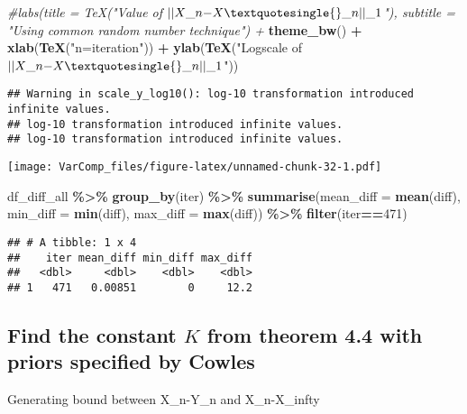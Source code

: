 \documentclass[
]{article}
\newenvironment{Shaded}{\begin{snugshade}}{\end{snugshade}}
\newcommand{\AttributeTok}[1]{\textcolor[rgb]{0.13,0.29,0.53}{#1}}
\newcommand{\CommentTok}[1]{\textcolor[rgb]{0.56,0.35,0.01}{\textit{#1}}}
\newcommand{\DecValTok}[1]{\textcolor[rgb]{0.00,0.00,0.81}{#1}}
\newcommand{\FunctionTok}[1]{\textcolor[rgb]{0.13,0.29,0.53}{\textbf{#1}}}
\newcommand{\NormalTok}[1]{#1}
\newcommand{\SpecialCharTok}[1]{\textcolor[rgb]{0.81,0.36,0.00}{\textbf{#1}}}
\newcommand{\StringTok}[1]{\textcolor[rgb]{0.31,0.60,0.02}{#1}}
\begin{document}
\begin{Shaded}
\begin{Highlighting}[]
  \CommentTok{\#labs(title = TeX("Value of $||X\_n{-}X\textquotesingle{}\_n||\_1$"), subtitle = "Using common random number technique") +}
  \FunctionTok{theme\_bw}\NormalTok{() }\SpecialCharTok{+}
  \FunctionTok{xlab}\NormalTok{(}\FunctionTok{TeX}\NormalTok{(}\StringTok{"n=iteration"}\NormalTok{)) }\SpecialCharTok{+} \FunctionTok{ylab}\NormalTok{(}\FunctionTok{TeX}\NormalTok{(}\StringTok{"Logscale of $||X\_n{-}X\textquotesingle{}\_n||\_1$"}\NormalTok{))}
\end{Highlighting}
\end{Shaded}

\begin{verbatim}
## Warning in scale_y_log10(): log-10 transformation introduced infinite values.
## log-10 transformation introduced infinite values.
## log-10 transformation introduced infinite values.
\end{verbatim}

\texttt{[image: VarComp\_files/figure-latex/unnamed-chunk-32-1.pdf]}

\begin{Shaded}
\begin{Highlighting}[]
\NormalTok{df\_diff\_all }\SpecialCharTok{\%\textgreater{}\%}
  \FunctionTok{group\_by}\NormalTok{(iter) }\SpecialCharTok{\%\textgreater{}\%}
  \FunctionTok{summarise}\NormalTok{(}\AttributeTok{mean\_diff =} \FunctionTok{mean}\NormalTok{(diff), }\AttributeTok{min\_diff =}  \FunctionTok{min}\NormalTok{(diff), }\AttributeTok{max\_diff =} \FunctionTok{max}\NormalTok{(diff)) }\SpecialCharTok{\%\textgreater{}\%} 
  \FunctionTok{filter}\NormalTok{(iter}\SpecialCharTok{==}\DecValTok{471}\NormalTok{)}
\end{Highlighting}
\end{Shaded}

\begin{verbatim}
## # A tibble: 1 x 4
##    iter mean_diff min_diff max_diff
##   <dbl>     <dbl>    <dbl>    <dbl>
## 1   471   0.00851        0     12.2
\end{verbatim}

\subsection{\texorpdfstring{Find the constant \(K\) from theorem 4.4
with priors specified by
Cowles}{Find the constant K from theorem 4.4 with priors specified by Cowles}}\label{find-the-constant-k-from-theorem-4.4-with-priors-specified-by-cowles}

Generating bound between \textbar X\_n-Y\_n\textbar{} and
\textbar X\_n-X\_infty\textbar{}
\end{document}
